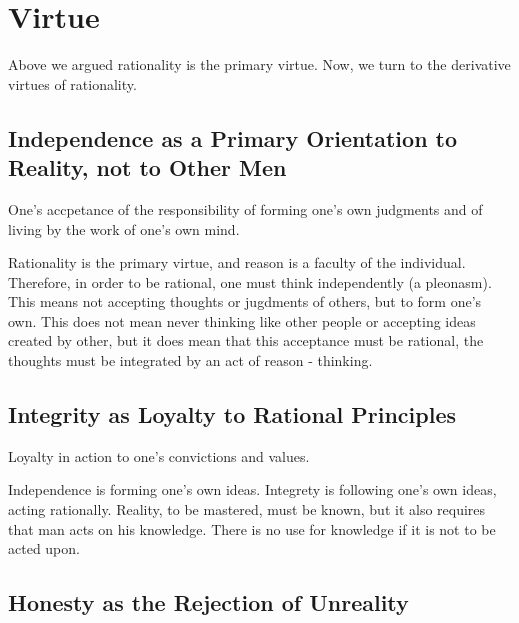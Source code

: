 \chapter{Virtue}

    Above we argued rationality is the primary virtue. Now, we turn to the derivative virtues of rationality.

    \section{Independence as a Primary Orientation to Reality, not to Other Men}

        \begin{definition}[Independence]
        \label{def:independence}
            One's accpetance of the responsibility of forming one's own judgments and of living by the work of one's own mind.
        \end{definition}

        Rationality is the primary virtue, and reason is a faculty of the individual. Therefore, in order to be rational, one must think independently (a pleonasm). This means not accepting thoughts or jugdments of others, but to form one's own. This does not mean never thinking like other people or accepting ideas created by other, but it does mean that this acceptance must be rational, the thoughts must be integrated by an act of reason - thinking.

    \section{Integrity as Loyalty to Rational Principles}

        \begin{definition}[Integrity]
        \label{def:integrity}
            Loyalty in action to one's convictions and values.
        \end{definition}

        Independence is forming one's own ideas. Integrety is following one's own ideas, acting rationally. Reality, to be mastered, must be known, but it also requires that man acts on his knowledge. There is no use for knowledge if it is not to be acted upon.

    \section{Honesty as the Rejection of Unreality}

        

